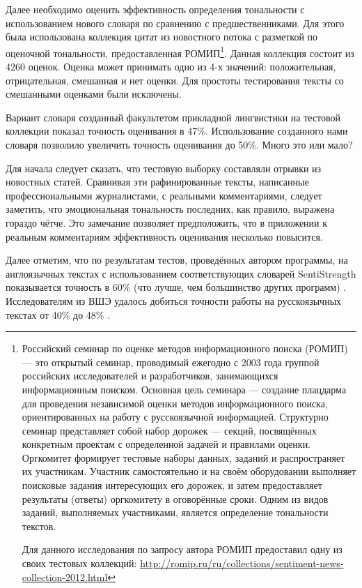 Далее необходимо оценить эффективность определения тональности с использованием нового словаря по сравнению с предшественниками. Для этого была использована коллекция цитат из новостного потока с разметкой по оценочной тональности, предоставленная РОМИП\footnote{Российский семинар по оценке методов информационного поиска (РОМИП) — это открытый семинар, проводимый ежегодно с 2003 года группой российских исследователей и разработчиков, занимающихся информационным поиском. Основная цель семинара — создание плацдарма для проведения независимой оценки методов информационного поиска, ориентированных на работу с русскоязычной информацией. Структурно семинар представляет собой набор дорожек — секций, посвящённых конкретным проектам с определенной задачей и правилами оценки. Оргкомитет формирует тестовые наборы данных, заданий и распространяет их участникам. Участник самостоятельно и на своём оборудовании выполняет поисковые задания интересующих его дорожек, и затем предоставляет результаты (ответы) оргкомитету в оговорённые сроки. Одним из видов заданий, выполняемых участниками, является определение тональности текстов.

Для данного исследования по запросу автора РОМИП предоставил одну из своих тестовых коллекций: \url{http://romip.ru/ru/collections/sentiment-news-collection-2012.html}}. Данная коллекция состоит из 4260 оценок. Оценка может принимать одно из 4-х значений: положительная, отрицательная, смешанная и нет оценки. Для простоты тестирования тексты со смешанными оценками были исключены.

Вариант словаря созданный факультетом прикладной лингвистики на тестовой коллекции показал точность оценивания в 47\%. Использование созданного нами словаря позволило увеличить точность оценивания до 50\%. Много это или мало?

Для начала следует сказать, что тестовую выборку составляли отрывки из новостных статей. Сравнивая эти рафинированные тексты, написанные профессиональными журналистами, с реальными комментариями, следует заметить, что эмоциональная тональность последних, как правило, выражена гораздо чётче. Это замечание позволяет предположить, что в приложении к реальным комментариям эффективность оценивания несколько повысится.

Далее отметим, что по результатам тестов, проведённых автором программы, на англоязычных текстах с использованием соответствующих словарей SentiStrength показывается точность в 60\% (что лучше, чем большинство других программ) \cite{SentiStrength}. Исследователям из ВШЭ удалось добиться точности работы на русскоязычных текстах от 40\% до 48\% \cite[стр. 49]{kolcova_sentistrength}.

